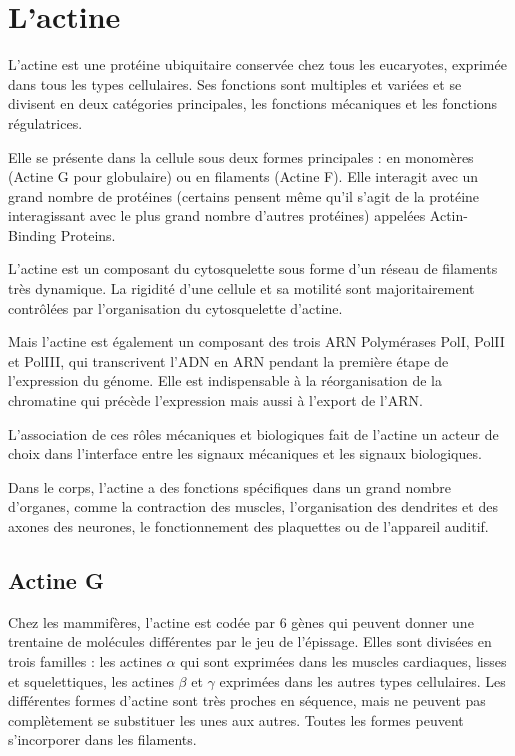 \documentclass{report}
\begin{document}
\chapter{L'actine}

L'actine est une protéine ubiquitaire conservée chez tous les eucaryotes, exprimée dans tous les types cellulaires. 
Ses fonctions sont multiples et variées et se divisent en deux catégories principales, les fonctions mécaniques et les fonctions régulatrices. 

Elle se présente dans la cellule sous deux formes principales : en monomères (Actine G pour globulaire) ou en filaments (Actine F). 
Elle interagit avec un grand nombre de protéines (certains pensent même qu'il s'agit de la protéine interagissant avec le plus grand nombre d'autres protéines) appelées Actin-Binding Proteins. 

L'actine est un composant du cytosquelette sous forme d'un réseau de filaments très dynamique. La rigidité d'une cellule et sa motilité sont majoritairement contrôlées par l'organisation du cytosquelette d'actine. 

Mais l'actine est également un composant des trois ARN Polymérases PolI, PolII et PolIII, qui transcrivent l'ADN en ARN pendant la première étape de l'expression du génome. 
Elle est indispensable à la réorganisation de la chromatine qui précède l'expression mais aussi à l'export de l'ARN.  

L'association de ces rôles mécaniques et biologiques fait de l'actine un acteur de choix dans l'interface entre les signaux mécaniques et les signaux biologiques. 

Dans le corps, l'actine a des fonctions spécifiques dans un grand nombre d'organes, comme la contraction des muscles, l'organisation des dendrites et des axones des neurones, le fonctionnement des plaquettes ou de l'appareil auditif. 



\section{Actine G}

Chez les mammifères, l'actine est codée par 6 gènes qui peuvent donner une trentaine de molécules différentes par le jeu de l'épissage. 
Elles sont divisées en trois familles : les actines $\alpha$ qui sont exprimées dans les muscles cardiaques, lisses et squelettiques, les actines $\beta$ et $\gamma$ exprimées dans les autres types cellulaires.
Les différentes formes d'actine sont très proches en séquence, mais ne peuvent pas complètement se substituer les unes aux autres. Toutes les formes peuvent s'incorporer dans les filaments. 
\end{document}
